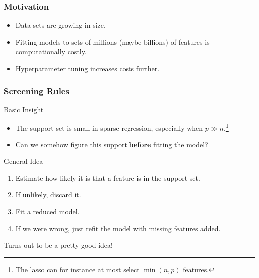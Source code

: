\documentclass[10pt]{beamer}
\begin{document}
\begin{frame}[c]
  \frametitle{Motivation}

  \begin{itemize}[<+->]
    \item Data sets are growing in size.
    \item Fitting models to sets of millions (maybe billions) of features is computationally costly.
    \item Hyperparameter tuning increases costs further.
  \end{itemize}

\end{frame}

\begin{frame}[c]
  \frametitle{Screening Rules}

  \begin{block}{Basic Insight}
    \begin{itemize}
      \item The support set is small in sparse regression, especially when \(p \gg n\).\footnote{The
              lasso can for instance at most select \(\min(n, p)\) features.}
      \item Can we somehow figure this support \textbf{before} fitting the model?
    \end{itemize}
  \end{block}

  \pause

  \begin{block}{General Idea}
    \begin{enumerate}
      \item Estimate how likely it is that a feature is in the support set.
      \item If unlikely, discard it.
      \item Fit a reduced model.
      \item If we were wrong, just refit the model with missing features added.
    \end{enumerate}
  \end{block}

  \medskip\pause

  Turns out to be a pretty good idea!
\end{frame}
\end{document}
